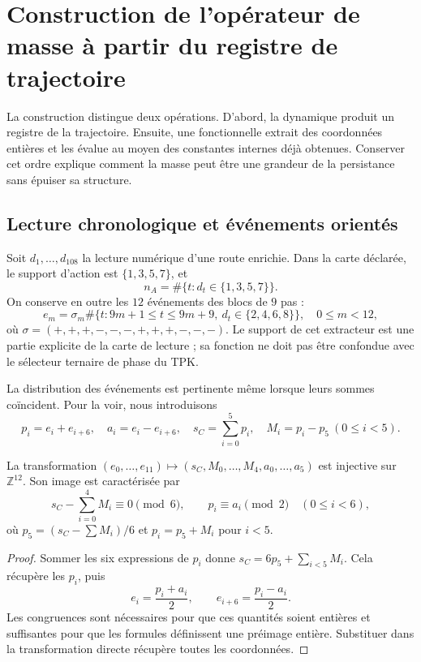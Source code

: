 \section{Construction de l'opérateur de masse à partir du registre de trajectoire}
\label{vi:vi:sec:operador-masa}

La construction distingue deux opérations. D’abord, la dynamique produit
un registre de la trajectoire. Ensuite, une fonctionnelle extrait des coordonnées
entières et les évalue au moyen des constantes internes déjà obtenues.
Conserver cet ordre explique comment la masse peut être une grandeur de la
persistance sans épuiser sa structure.

\subsection{Lecture chronologique et événements orientés}

Soit \(d_1,\ldots,d_{108}\) la lecture numérique d'une route enrichie.
Dans la carte déclarée, le support d'action est \(\{1,3,5,7\}\), et
\[
 n_A=\#\{t:d_t\in\{1,3,5,7\}\}.
\]
On conserve en outre les \(12\) événements des blocs de \(9\) pas :
\[
 e_m=\sigma_m\#\{t:9m+1\le t\le9m+9,\ d_t\in\{2,4,6,8\}\},
 \quad 0\le m<12,
\]
où \(\sigma=(+,+,+,-,-,-,+,+,+,-,-,-)\). Le support de cet
extracteur est une partie explicite de la carte de lecture ; sa fonction ne
doit pas être confondue avec le sélecteur ternaire de phase du TPK.

La distribution des événements est pertinente même lorsque leurs sommes
coïncident. Pour la voir, nous introduisons
\[
 p_i=e_i+e_{i+6},\quad a_i=e_i-e_{i+6},\quad
 s_C=\sum_{i=0}^{5}p_i,\quad M_i=p_i-p_5\ (0\le i<5).
\]

\begin{proposition}
\label{vi:vi:prop:eventos}
La transformation \((e_0,\ldots,e_{11})\mapsto(s_C,M_0,\ldots,M_4,a_0,\ldots,a_5)\)
est injective sur \(\mathbb Z^{12}\). Son image est caractérisée par
\[
 s_C-\sum_{i=0}^4M_i\equiv0\pmod6,
 \qquad p_i\equiv a_i\pmod2\quad(0\le i<6),
\]
où \(p_5=(s_C-\sum M_i)/6\) et \(p_i=p_5+M_i\) pour \(i<5\).
\end{proposition}
\begin{proof}
Sommer les six expressions de \(p_i\) donne
\(s_C=6p_5+\sum_{i<5}M_i\). Cela récupère les \(p_i\), puis
\[
 e_i=\frac{p_i+a_i}{2},\qquad
 e_{i+6}=\frac{p_i-a_i}{2}.
\]
Les congruences sont nécessaires pour que ces quantités soient entières et
suffisantes pour que les formules définissent une préimage entière. Substituer
dans la transformation directe récupère toutes les coordonnées.
\end{proof}

